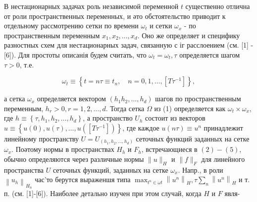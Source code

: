 \documentclass[10pt]{article}
\begin{document}
В нестационарных задачах роль независимой переменной $t$ существенно отлична от роли пространственных переменных, и әто обстоятельство приводит к отдельному рассмотрению сетки по времени $\omega_{t}$ и сетки $\omega_{x}$ - по пространственным переменным $x_{1}, x_{2}, \ldots, x_{d}$. Оно же определяет и специфику разностных схем для нестационарных задач, связанную с іг расслоением (см. [1] - [6]). Для простоты описанія будем считать, что $\omega_{t}=\omega_{t}, \tau$ определяется шагом $\tau>0$, т.е.



\[

\omega_{t} \equiv\left\{t=n \tau \equiv t_{n}, \quad n=0,1, \ldots,\left[T \tau^{-1}\right]\right\},

\]



а сетка $\omega_{x}$ определяется вектором $\left(h_{1} h_{2}, \ldots, h_{d}\right)$ шагов по пространственным переменным, $h_{r}>0, r=1,2, \ldots, d$. Тогда сетка $\Omega$ из (1) определяется как $\omega_{t} \times \omega_{x}$, где $h \equiv\left\{\tau, h_{1}, h_{2}, \ldots, h_{d}\right\}$, а пространство $U_{h}$ состоит из векторов $u \equiv\left\{u(0), u(\tau), \ldots, u\left(\left[T \tau^{-1}\right]\right)\right\}$, где каждое $u(n \tau) \equiv u^{n}$ принадлежит линейному пространству $U=U_{\left(h_{1}, h_{2}, \ldots, h_{d}\right)}$ сеточных функций заданных на сетке $\omega_{x}$. Поәтому нормы в пространствах $H_{h}$ и $F_{h}$, встречающиеся в $(2)-(5)$, обычно определяются через различные нормы $\|u\|_{H}$ и $\|f\|_{F}$ для линейного пространства $U$ сеточных функций, заданных на сетке $\omega_{x}$. Напр., в роли $\left\|u_{h}\right\|_{H_{n}}$ час'то берутся выраженшя типа $\max _{t^{n} \in \omega t}\left\|u^{n}\right\|_{H}, \tau \sum_{n}\left\|u^{n}\right\|_{H}$ и т. п. (см. [1]-[6]). Наиболее детально изучен при этом случай, когда $H$ и $F$ явля-
\end{document}
